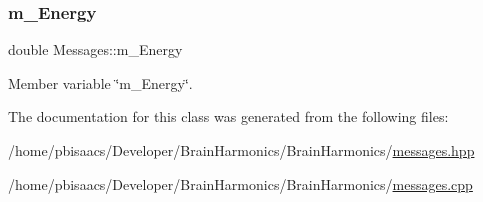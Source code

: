 \mbox{\label{classMessages_afd1431daeff8d60f5856b36144b49f87}} 
\subsubsection{\texorpdfstring{m\+\_\+\+Energy}{m\_Energy}}
{\footnotesize\ttfamily double Messages\+::m\+\_\+\+Energy\hspace{0.3cm}{\ttfamily [private]}}



Member variable \char`\"{}m\+\_\+\+Energy\char`\"{}. 



The documentation for this class was generated from the following files\+:\begin{DoxyCompactItemize}
\item 
/home/pbisaacs/\+Developer/\+Brain\+Harmonics/\+Brain\+Harmonics/\mbox{\hyperlink{messages_8hpp}{messages.\+hpp}}\item 
/home/pbisaacs/\+Developer/\+Brain\+Harmonics/\+Brain\+Harmonics/\mbox{\hyperlink{messages_8cpp}{messages.\+cpp}}\end{DoxyCompactItemize}
